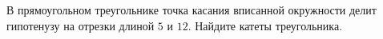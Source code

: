 \begin{ex}
	\begin{condition}
		В прямоугольном треугольнике точка касания вписанной окружности делит гипотенузу на отрезки длиной \( 5  \) и \( 12 \).	Найдите катеты треугольника.
	\end{condition}
\end{ex}